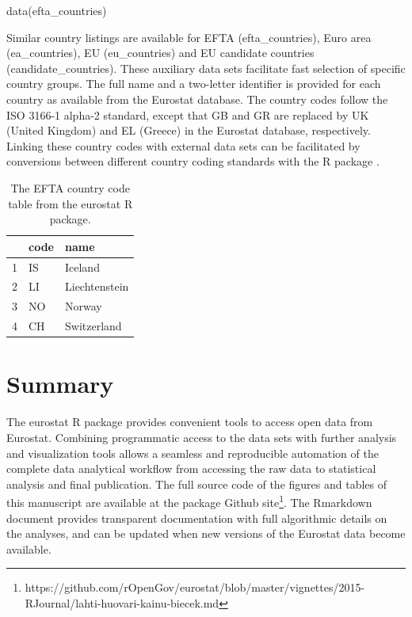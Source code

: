 \begin{example}
data(efta_countries)
\end{example}

Similar country listings are available for EFTA (efta\_countries),
Euro area (ea\_countries), EU (eu\_countries) and EU candidate
countries (candidate\_countries). These auxiliary data sets facilitate
fast selection of specific country groups. The full name and a
two-letter identifier is provided for each country as available from
the Eurostat database. The country codes follow the ISO 3166-1 alpha-2
standard, except that GB and GR are replaced by UK (United Kingdom)
and EL (Greece) in the Eurostat database, respectively. Linking these
country codes with external data sets can be facilitated by
conversions between different country coding standards with
the  R package \citep{countrycode}.


\begin{table}[ht]
\centering
\begin{tabular}{rll}
\toprule
  \hline
  & code & name \\ 
  \hline
  1 & IS & Iceland \\ 
  2 & LI & Liechtenstein \\ 
  3 & NO & Norway \\ 
  4 & CH & Switzerland \\ 
   \hline
\bottomrule   
\end{tabular}
\label{tab:efta}
\caption{The EFTA country code table from the eurostat R package.}
\end{table}



\section{Summary}

The eurostat R package provides convenient tools to access open data
from Eurostat. Combining programmatic access to the data sets with
further analysis and visualization tools allows a seamless and
reproducible automation of the complete data analytical workflow from
accessing the raw data to statistical analysis and final
publication. The full source code of the figures and tables of this
manuscript are available at the package Github
site\footnote{https://github.com/rOpenGov/eurostat/blob/master/vignettes/2015-RJournal/lahti-huovari-kainu-biecek.md}. The
Rmarkdown document provides transparent documentation with full
algorithmic details on the analyses, and can be updated when new
versions of the Eurostat data become available.

